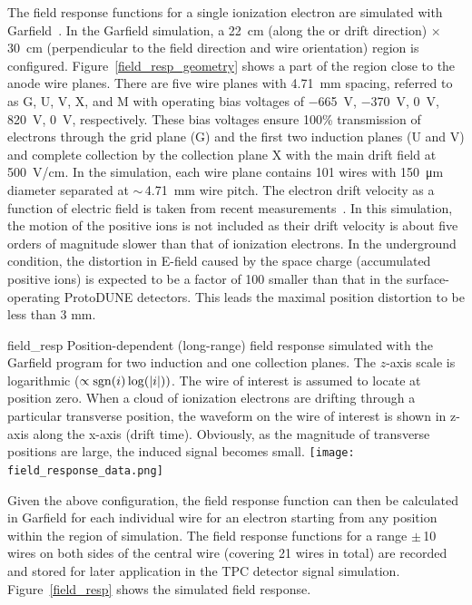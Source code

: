 The field response functions for a single ionization electron are simulated with Garfield~\cite{garfield}.  
In the Garfield simulation, a \SI{22}{cm} (along the \efield or drift direction) $\times$ 
\SI{30}{cm} (perpendicular to the field direction and wire orientation) region is configured.  
Figure~\ref{field_resp_geometry} shows a part of the region close to the anode wire planes. There are five wire planes with \SI{4.71}{mm} spacing, referred to as G, U, V, X, and 
M with operating bias voltages of \SI{-665}{V}, \SI{-370}{V}, \SI{0}{V}, \SI{820}{V}, \SI{0}{V}, respectively.  
These bias voltages ensure 100\% transmission of electrons through the grid plane (G) and the 
first two induction planes (U and V) and complete collection by the collection plane X with the main drift 
field at \SI{500}{V/cm}. In the simulation, each wire plane contains 101 wires with \SI{150}{\micro\meter} diameter
  separated at $\sim\,$\SI{4.71}{\mm} wire pitch. The electron drift velocity as a function of electric
  field is taken from recent measurements~\cite{Li:2015rqa,larpropertiesbnl}. In this simulation, the motion of the positive ions is not included as their drift velocity is about five orders of magnitude slower than that of ionization electrons. In the underground condition, the distortion in E-field caused by the space charge (accumulated positive ions) is expected to be a factor of 100 smaller than that in the surface-operating ProtoDUNE detectors. This leads the maximal position distortion to be less than 3 mm. 
\begin{dunefigure}
{field_resp}
{Position-dependent (long-range) field response simulated with the Garfield program 
for two induction and one collection planes.
The $z$-axis scale is logarithmic ($\propto{\rm sgn}(i)\log(|i|))$.
The wire of interest 
is assumed to locate at position zero. When a cloud of ionization electrons are drifting through a particular transverse position, the waveform on the wire of interest is shown in z-axis along the x-axis (drift time). Obviously, as the magnitude of transverse positions are large, the induced signal becomes small.}
\texttt{[image: field\_response\_data.png]}
\end{dunefigure}


 Given the above configuration, the field response function can then be calculated in Garfield
  for each individual wire  for an
  electron starting from any position within the region of simulation. 
  The field response functions for a range $\pm\,$10 wires on both sides of the central wire (covering 21 wires in total) are 
  recorded %
  and stored for later
  application in the TPC detector signal simulation.
  Figure~\ref{field_resp} shows the simulated field response.
  
